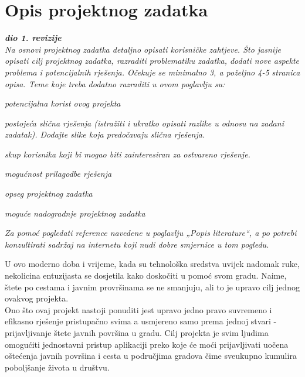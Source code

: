 \chapter{Opis projektnog zadatka}
		
		\textbf{\textit{dio 1. revizije}}\\
		
		\textit{Na osnovi projektnog zadatka detaljno opisati korisničke zahtjeve. Što jasnije opisati cilj projektnog zadatka, razraditi problematiku zadatka, dodati nove aspekte problema i potencijalnih rješenja. Očekuje se minimalno 3, a poželjno 4-5 stranica opisa.	Teme koje treba dodatno razraditi u ovom poglavlju su:}
		\begin{packed_item}
			\item \textit{potencijalna korist ovog projekta}
			\item \textit{postojeća slična rješenja (istražiti i ukratko opisati razlike u odnosu na zadani zadatak). Dodajte slike koja predočavaju slična rješenja.}
			\item \textit{skup korisnika koji bi mogao biti zainteresiran za ostvareno rješenje.}
			\item \textit{mogućnost prilagodbe rješenja }
			\item \textit{opseg projektnog zadatka}
			\item \textit{moguće nadogradnje projektnog zadatka}
		\end{packed_item}
		
		\textit{Za pomoć pogledati reference navedene u poglavlju „Popis literature“, a po potrebi konzultirati sadržaj na internetu koji nudi dobre smjernice u tom pogledu.}
		\eject
		
		 U ovo moderno doba i vrijeme, kada su tehnološka sredstva uvijek nadomak ruke, nekolicina entuzijasta se dosjetila kako doskočiti u pomoć svom gradu. Naime, štete po cestama i javnim provršinama se ne smanjuju, ali to je upravo cilj jednog ovakvog projekta. \\
		
		 Ono što ovaj projekt nastoji ponuditi jest upravo jedno pravo suvremeno i efikasno rješenje pristupačno svima a usmjereno samo prema jednoj stvari - prijavljivanje štete javnih površina u gradu. Cilj projekta je svim ljudima omogućiti jednostavni pristup aplikaciji preko koje će moći prijavljivati uočena oštećenja javnih površina i cesta u područjima gradova čime sveukupno kumulira poboljšanje života u društvu.\\
		

